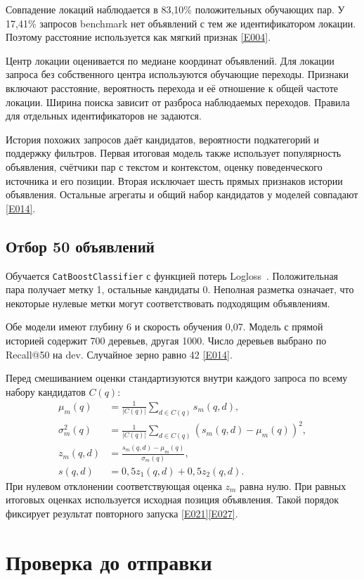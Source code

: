 \documentclass{article}
\newcommand{\ev}[1]{\href{https://github.com/revefffect/avito-contest/blob/main/evidence/INDEX.md\#E#1}{[E#1]}}
\newcommand{\file}[1]{\texttt{\small #1}}
\begin{document}
Совпадение локаций наблюдается в 83{,}10\% положительных обучающих пар. У 17{,}41\% запросов benchmark нет объявлений с тем же идентификатором локации. Поэтому расстояние используется как мягкий признак \ev{004}.

Центр локации оценивается по медиане координат объявлений. Для локации запроса без собственного центра используются обучающие переходы. Признаки включают расстояние, вероятность перехода и её отношение к общей частоте локации. Ширина поиска зависит от разброса наблюдаемых переходов. Правила для отдельных идентификаторов не задаются.

История похожих запросов даёт кандидатов, вероятности подкатегорий и поддержку фильтров. Первая итоговая модель также использует популярность объявления, счётчики пар с текстом и контекстом, оценку поведенческого источника и его позиции. Вторая исключает шесть прямых признаков истории объявления. Остальные агрегаты и общий набор кандидатов у моделей совпадают \ev{014}.

\subsection{Отбор 50 объявлений}

Обучается \file{CatBoostClassifier} с функцией потерь Logloss~\citep{catboost}. Положительная пара получает метку 1, остальные кандидаты 0. Неполная разметка означает, что некоторые нулевые метки могут соответствовать подходящим объявлениям.

Обе модели имеют глубину 6 и скорость обучения 0{,}07. Модель с прямой историей содержит 700 деревьев, другая 1000. Число деревьев выбрано по Recall@50 на dev. Случайное зерно равно 42 \ev{014}.

Перед смешиванием оценки стандартизуются внутри каждого запроса по всему набору кандидатов $C(q)$:
\begin{align}
\mu_m(q)&=\frac{1}{|C(q)|}\sum_{d\in C(q)}s_m(q,d),\\
\sigma_m^2(q)&=\frac{1}{|C(q)|}\sum_{d\in C(q)}(s_m(q,d)-\mu_m(q))^2,\\
z_m(q,d)&=\frac{s_m(q,d)-\mu_m(q)}{\sigma_m(q)},\\
s(q,d)&=0{,}5z_1(q,d)+0{,}5z_2(q,d).
\end{align}
При нулевом отклонении соответствующая оценка $z_m$ равна нулю. При равных итоговых оценках используется исходная позиция объявления. Такой порядок фиксирует результат повторного запуска \ev{021}\ev{027}.

\section{Проверка до отправки}
\end{document}
